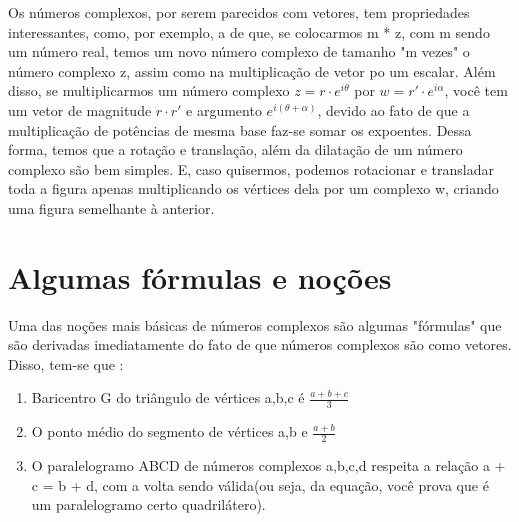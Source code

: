 \documentclass{article}
\begin{document}
Os números complexos, por serem parecidos com vetores, tem propriedades interessantes, como, por exemplo, a de que, se colocarmos m * z, com m sendo um número real, temos um novo número complexo de tamanho "m vezes" o número complexo z, assim como na multiplicação de vetor po um escalar. Além disso, se multiplicarmos um número complexo $z = r \cdot e^{i \theta}$ por $w = r' \cdot e^{i \alpha}$, você tem um vetor de magnitude $r \cdot r'$ e argumento $e^{i(\theta + \alpha)}$, devido ao fato de que a multiplicação de potências de mesma base faz-se somar os expoentes. Dessa forma, temos que a rotação e translação, além da dilatação de um número complexo são bem simples. E, caso quisermos, podemos rotacionar e transladar toda a figura apenas multiplicando os vértices dela por um complexo w, criando uma figura semelhante à anterior.
\begin{center}
\end{center}

\section{Algumas fórmulas e noções}

Uma das noções mais básicas de números complexos são algumas "fórmulas" que são derivadas imediatamente do fato de que números complexos são como vetores. Disso, tem-se que : 
\begin{enumerate}
    \item Baricentro G do triângulo de vértices a,b,c é $\frac{a+b+c}{3}$
    \item O ponto médio do segmento de vértices a,b e $\frac{a+b}{2}$
    \item O paralelogramo ABCD de números complexos a,b,c,d respeita a relação a + c = b + d, com a volta sendo válida(ou seja, da equação, você prova que é um paralelogramo certo quadrilátero).
\end{enumerate}
\end{document}
